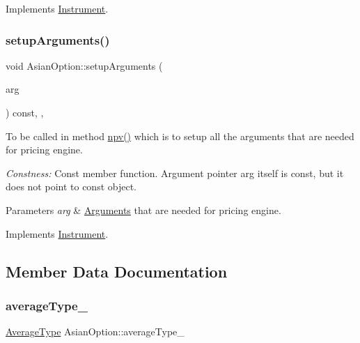 Implements \hyperlink{class_instrument_a381f093402f789ad7c0ffecd233167dc}{Instrument}.

\hypertarget{class_asian_option_a82c9b5fb3bea69f476a65e9675e1cc28}{}\label{class_asian_option_a82c9b5fb3bea69f476a65e9675e1cc28} 
\subsubsection{\texorpdfstring{setup\+Arguments()}{setupArguments()}}
{\footnotesize\ttfamily void Asian\+Option\+::setup\+Arguments (\begin{DoxyParamCaption}\item[{\hyperlink{class_pricing_engine_1_1_arguments}{Pricing\+Engine\+::\+Arguments} $\ast$const}]{arg }\end{DoxyParamCaption}) const\hspace{0.3cm}{\ttfamily [override]}, {\ttfamily [private]}, {\ttfamily [virtual]}}



To be called in method \hyperlink{class_instrument_aa750f2ae95a21d65a073da3171e8d084}{npv()} which is to setup all the arguments that are needed for pricing engine. 

{\itshape Constness\+:} Const member function. Argument pointer arg itself is const, but it does not point to const object. 
\begin{DoxyParams}{Parameters}
{\em arg} & \hyperlink{class_asian_option_1_1_arguments}{Arguments} that are needed for pricing engine. \\
\hline
\end{DoxyParams}


Implements \hyperlink{class_instrument_a5cd384be384fe415f09ecc78e2a87539}{Instrument}.



\subsection{Member Data Documentation}
\hypertarget{class_asian_option_a602d4f41bc033a8242a0641cf5104045}{}\label{class_asian_option_a602d4f41bc033a8242a0641cf5104045} 
\subsubsection{\texorpdfstring{average\+Type\+\_\+}{averageType\_}}
{\footnotesize\ttfamily \hyperlink{class_asian_option_add7292791bf85820ff9fdbfd4407f3b9}{Average\+Type} Asian\+Option\+::average\+Type\+\_\+\hspace{0.3cm}{\ttfamily [private]}}

